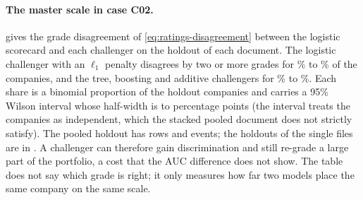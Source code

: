 \paragraph{The master scale in case C02.}  gives the grade disagreement of \cref{eq:ratings-disagreement} between the logistic scorecard and each challenger on the holdout of each document. The logistic challenger with an $\ell_1$ penalty disagrees by two or more grades for \rtgCzLOneMin{}\% to \rtgCzLOneMax{}\% of the companies, and the tree, boosting and additive challengers for \rtgCzOtherMin{}\% to \rtgCzMax{}\%. Each share is a binomial proportion of the holdout companies and carries a 95\% Wilson interval whose half-width is \rtgCzHalfMin{} to \rtgCzHalfMax{} percentage points (the interval treats the companies as independent, which the stacked pooled document does not strictly satisfy). The pooled holdout has \rtgCzHoldRows{} rows and \rtgCzHoldEvents{} events; the holdouts of the single files are in . A challenger can therefore gain discrimination and still re-grade a large part of the portfolio, a cost that the AUC difference does not show. The table does not say which grade is right; it only measures how far two models place the same company on the same scale.


